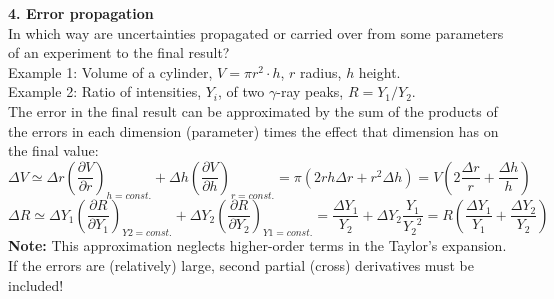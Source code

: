\documentclass[12pt]{article}
\begin{document}
\newpage
{\large\bf 4. Error propagation}\\
In which way are uncertainties propagated or carried over from
some parameters of an experiment to the final result?\\
Example 1:
Volume of a cylinder, $V=\pi r^2\cdot h$, $r$ radius, $h$ height.\\
Example 2:
Ratio of intensities, $Y_i$, of two $\gamma$-ray peaks, $R=Y_1/Y_2$.\\

The error in the final result can be approximated by the sum of the products
of the errors in each dimension (parameter) times the effect that dimension
has on the final value:\\
\begin{displaymath}
\Delta V\simeq \Delta r\left(\frac{\partial V}{\partial r}\right)_{h=const.}
+\Delta h\left(\frac{\partial V}{\partial h}\right)_{r=const.}
= \pi(2rh\Delta r + r^2\Delta h) = V\left(
2\frac{\Delta r}{r}+\frac{\Delta h}{h}\right)
\end{displaymath}
\begin{displaymath}
\Delta R\simeq
 \Delta Y_1\left(\frac{\partial R}{\partial Y_1}\right)_{Y2=const.}
+\Delta Y_2\left(\frac{\partial R}{\partial Y_2}\right)_{Y1=const.}
= \frac{\Delta Y_1}{Y_2} + \Delta Y_2\frac{Y_1}{{Y_2}^2}
= R\left(\frac{\Delta Y_1}{Y_1}+\frac{\Delta Y_2}{Y_2}\right)
\end{displaymath}
{\bf Note:} This approximation neglects higher-order terms in the
Taylor's expansion. If the errors are (relatively) large, second partial
(cross) derivatives  must be included!\\
\end{document}
